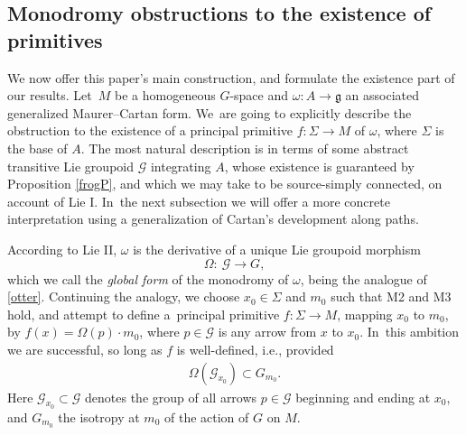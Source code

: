 \subsection*{Monodromy obstructions to the existence of
 primitives}

We now offer this paper's main construction, and formulate the
existence part of our results. Let~$M$ be a homogeneous $G$-space and
$\omega \colon A \rightarrow {\mathfrak g} $ an associated generalized
Maurer--Cartan form. We~are going to explicitly describe the
obstruction to the existence of a principal primitive
$f \colon \Sigma \rightarrow M $ of $\omega $, where $\Sigma $ is the
base of $A$. The most natural description is in terms of some abstract
transitive Lie groupoid ${\mathcal G}$ integrating $A$, whose
existence is guaranteed by Proposition \ref{frogP}, and which we may
take to be source-simply connected, on account of Lie I. In~the next
subsection we will offer a more concrete interpretation using a
generalization of Cartan's development along paths.

According to Lie II, $\omega $ is the derivative of a unique Lie
groupoid morphism
\begin{equation}\label{global}
 \Omega \colon\ {\mathcal G} \rightarrow G,
\end{equation}
which we call the {\it global form} of the monodromy of $\omega $,
being the analogue of \eqref{otter}. Continuing the analogy, we
choose $x_0 \in \Sigma $ and $m_0$ such that M2 and M3 hold, and
attempt to define a~principal primitive
$f \colon \Sigma \rightarrow M$, mapping $x_0$ to $m_0$, by
$f(x)=\Omega(p)\cdot m_0 $, where $p \in {\mathcal G} $ is any arrow
from $x$ to $x_0$. In~this ambition we are successful, so long as $f$
is well-defined, i.e., provided
\begin{gather}
\Omega({\mathcal G}_{x_0}) \subset G_{m_0}.\label{newt}
\end{gather}
Here ${\mathcal G}_{x_0} \subset {\mathcal G}$ denotes
the group of all arrows $p \in {\mathcal G} $ beginning and ending at
$x_0$, and $G_{m_0}$ the isotropy at $m_0 $ of the action of $G$ on
$M$.


